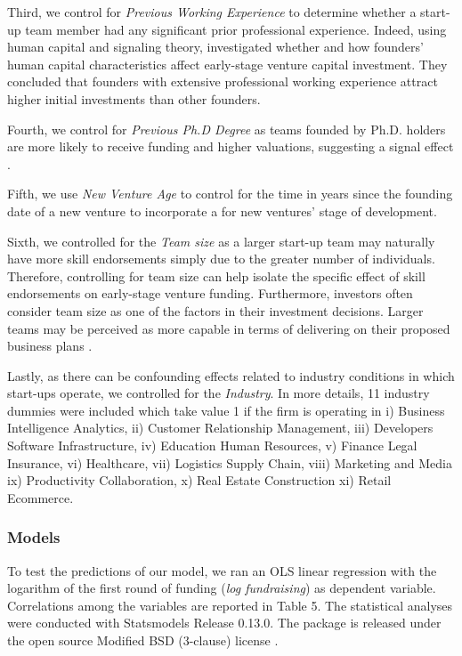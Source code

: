 \documentclass[12pt]{article}
\begin{document}
Third, we control for \textit{Previous Working Experience} to determine whether a start-up team member had any significant prior professional experience. Indeed, using human capital and signaling theory, \citet{subramanian2022backing} investigated whether and how founders' human capital characteristics affect early-stage venture capital investment. They concluded that founders with extensive professional working experience attract higher initial investments than other founders.

Fourth, we control for \textit{Previous Ph.D Degree} as teams founded by Ph.D. holders are more likely to receive funding and higher valuations, suggesting a signal effect \citep{hsu2007experienced}.

Fifth, we use \textit{New Venture Age} to control for the time in years since the founding date of a new venture to incorporate a for new ventures' stage of development.

Sixth, we controlled for the \textit{Team size} as a larger start-up team may naturally have more skill endorsements simply due to the greater number of individuals. Therefore, controlling for team size can help isolate the specific effect of skill endorsements on early-stage venture funding. Furthermore, investors often consider team size as one of the factors in their investment decisions. Larger teams may be perceived as more capable in terms of delivering on their proposed business plans \citep{harrison2007s, williamsky1998demographyand}.

Lastly, as there can be confounding effects related to industry conditions in which start-ups operate, we controlled for the \textit{Industry}. In more details, 11 industry dummies were included which take value 1 if the firm is operating in i) Business Intelligence Analytics, ii) Customer Relationship Management, iii) Developers Software Infrastructure, iv) Education Human Resources, v) Finance Legal Insurance, vi) Healthcare, vii) Logistics Supply Chain, viii) Marketing and Media ix) Productivity Collaboration, x) Real Estate Construction xi) Retail Ecommerce.

\subsubsection{Models}

To test the predictions of our model, we ran an OLS linear regression with the logarithm of the first round of funding (\textit{log fundraising}) as dependent variable. Correlations among the variables are reported in Table 5\label{table5}. The statistical analyses were conducted with Statsmodels Release 0.13.0. The package is released under the open source Modified BSD (3-clause) license \citep{seabold2010statsmodels}. \\
\end{document}
